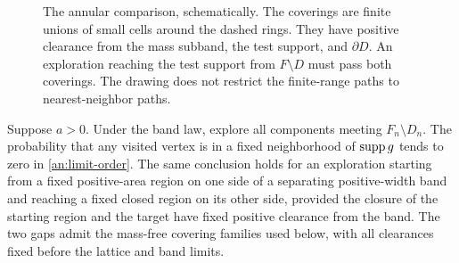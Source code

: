 \begin{figure}[t]
\centering
{}
\caption{The annular comparison, schematically.  The coverings
are finite unions of small cells around the dashed rings.  They
have positive clearance from the mass subband, the test support,
and $\partial D$.  An exploration reaching the test support from
$F\setminus D$ must pass both coverings.  The drawing does not
restrict the finite-range paths to nearest-neighbor paths.}
\label{an:band-figure}
\end{figure}

\begin{proposition}\label{an:reach}
Suppose $a>0$.  Under the band law, explore all components meeting $F_n\setminus
D_n$.  The probability that any visited vertex is in a fixed
neighborhood of $\operatorname{supp} g$ tends to zero in
\eqref{an:limit-order}.  The same conclusion holds for an
exploration starting from a fixed positive-area region on one
side of a separating positive-width band and reaching a fixed
closed region on its other side, provided the closure of the starting
region and the target have fixed positive clearance from the band.
The two gaps admit the mass-free covering families used below, with
all clearances fixed before the lattice and band limits.
\end{proposition}

